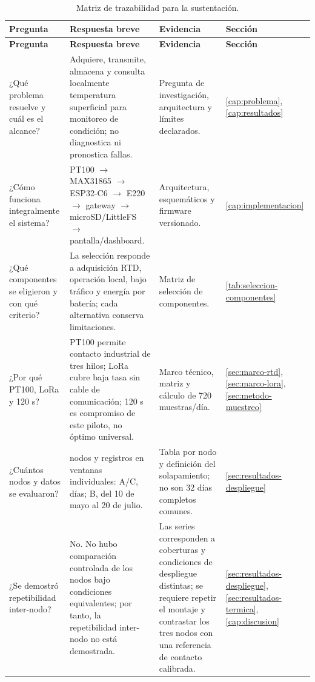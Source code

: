 \begingroup
\footnotesize\singlespacing
\setlength{\tabcolsep}{2.5pt}
\begin{longtable}{@{}>{\raggedright\arraybackslash}p{3.15cm}>{\raggedright\arraybackslash}p{4.25cm}>{\raggedright\arraybackslash}p{4.35cm}>{\raggedright\arraybackslash}p{2.65cm}@{}}
\caption{Matriz de trazabilidad para la sustentación.}\label{tab:anexos-sustentacion}\\
\toprule
\textbf{Pregunta} & \textbf{Respuesta breve} & \textbf{Evidencia} & \textbf{Sección} \\
\midrule\endfirsthead
\toprule
\textbf{Pregunta} & \textbf{Respuesta breve} & \textbf{Evidencia} & \textbf{Sección} \\
\midrule\endhead
\bottomrule\endfoot
¿Qué problema resuelve y cuál es el alcance? & Adquiere, transmite, almacena y consulta localmente temperatura superficial para monitoreo de condición; no diagnostica ni pronostica fallas. & Pregunta de investigación, arquitectura y límites declarados. & \ref{cap:problema}, \ref{cap:resultados} \\
¿Cómo funciona integralmente el sistema? & PT100 $\rightarrow$ MAX31865 $\rightarrow$ ESP32-C6 $\rightarrow$ E220 $\rightarrow$ gateway $\rightarrow$ microSD/LittleFS $\rightarrow$ pantalla/dashboard. & Arquitectura, esquemáticos y firmware versionado. & \ref{cap:implementacion} \\
¿Qué componentes se eligieron y con qué criterio? & La selección responde a adquisición RTD, operación local, bajo tráfico y energía por batería; cada alternativa conserva limitaciones. & Matriz de selección de componentes. & \ref{tab:seleccion-componentes} \\
¿Por qué PT100, LoRa y 120 s? & PT100 permite contacto industrial de tres hilos; LoRa cubre baja tasa sin cable de comunicación; 120 s es compromiso de este piloto, no óptimo universal. & Marco técnico, matriz y cálculo de 720 muestras/día. & \ref{sec:marco-rtd}, \ref{sec:marco-lora}, \ref{sec:metodo-muestreo} \\
¿Cuántos nodos y datos se evaluaron? & \NumeroNodos{} nodos y \TotalMuestras{} registros en ventanas individuales: A/C, \DuracionComunDias{} días; B, del 10 de mayo al 20 de julio. & Tabla por nodo y definición del solapamiento; no son 32 días completos comunes. & \ref{sec:resultados-despliegue} \\
¿Se demostró repetibilidad inter-nodo? & No. No hubo comparación controlada de los nodos bajo condiciones equivalentes; por tanto, la repetibilidad inter-nodo no está demostrada. & Las series corresponden a coberturas y condiciones de despliegue distintas; se requiere repetir el montaje y contrastar los tres nodos con una referencia de contacto calibrada. & \ref{sec:resultados-despliegue}, \ref{sec:resultados-termica}, \ref{cap:discusion} \\

\end{longtable}
